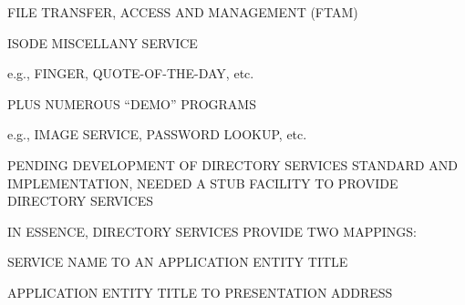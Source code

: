 

\begin{bwslide}

\begin{nrtc}
\item	FILE TRANSFER, ACCESS AND MANAGEMENT (FTAM)

\item	ISODE MISCELLANY SERVICE
    \begin{nrtc}
    \item	e.g., FINGER, QUOTE-OF-THE-DAY, etc.
    \end{nrtc}

\item	PLUS NUMEROUS ``DEMO'' PROGRAMS
    \begin{nrtc}
    \item	e.g., IMAGE SERVICE, PASSWORD LOOKUP, etc.
    \end{nrtc}
\end{nrtc}
\end{bwslide}


\begin{bwslide}

\begin{nrtc}
\item	PENDING DEVELOPMENT OF DIRECTORY SERVICES STANDARD AND IMPLEMENTATION,
	NEEDED A STUB FACILITY TO PROVIDE DIRECTORY SERVICES

\item	IN ESSENCE, DIRECTORY SERVICES PROVIDE TWO MAPPINGS:
    \begin{nrtc}
    \item	SERVICE NAME TO AN APPLICATION ENTITY TITLE

    \item	APPLICATION ENTITY TITLE TO PRESENTATION ADDRESS
    \end{nrtc}
\end{nrtc}
\end{bwslide}


